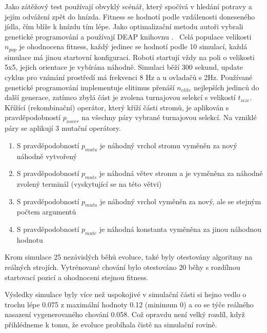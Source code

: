 \par 
Jako zátěžový test používají obvyklý scénář, který spočívá v hledání potravy a jejím odvážení zpět do hnízda. Fitness se hodnotí podle vzdálenosti doneseného jídla, čím blíže k hnízdu tím lépe. Jako optimalizační metodu autoři vybrali genetické programování a používají DEAP knihovnu \citep{deap}. \
Celá populace velikosti $n_{pop}$ je ohodnocena fitness, každý jedinec se hodnotí podle 10 simulací, každá simulace má jinou startovní konfiguraci. Roboti startují vždy na poli o velikosti 5x5, jejich orientace je vybírána náhodně. Simulaci běží 300 sekund, update cyklus pro vnímání prostředí má frekvenci 8 Hz a u ovladačů s 2Hz. Používané genetické programování implementuje elitimus přenáší $n_{elite}$ nejlepších jedinců do další generace, zatímco zbylá část je zvolena  turnajovou selekcí s velikostí $t_{size}$. Křížící (rekombinační) operátor, který kříží části stromů, je aplikován s pravděpodobností $p_{xover}$ na všechny páry vybrané turnajovou selekcí. Na vzniklé páry se aplikují 3 mutační operátory. \par
\begin{enumerate}
    \item S pravděpodobností $p_{mutu}$ je náhodný vrchol stromu vyměněn za nový náhodně vytvořený 
    \item S pravděpodobností $p_{muts}$ je náhodná větev stromu a je  vyměněna za náhodně zvolený terminál (vyskytující se na této větvi)
    \item S pravděpodobností $p_{mutn}$ je náhodný vrchol vyměněn za nový, ale se stejným počtem argumentů
    \item S pravděpodobností $p_{mute}$ je náhodná konstanta vyměněna za jinou náhodnou hodnotu
\end{enumerate}
Krom simulace 25 nezávislých běhů evoluce, také byly otestovány algoritmy na reálných strojích. Vytrénované chování bylo otestováno 20 běhy s rozdílnou startovací pozicí a ohodnoceni stejnou fitness. 
\par
Výsledky simulace byly více než uspokojivé v simulační části si hejno vedlo o trochu lépe 0.075 z maximální hodnoty 0.12 (minimum 0) a co se týče reálného nasazení vygenerovaného chování 0.058. Což opravdu není velký rozdíl, když přihlédneme k tomu, že evoluce probíhala čistě na simulační rovině.

